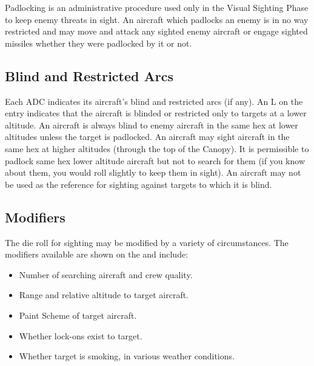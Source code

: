 Padlocking is an administrative procedure used only in the Visual Sighting Phase to keep enemy threats in sight. An aircraft which padlocks an enemy is in no way restricted and may move and attack any sighted enemy aircraft or engage sighted missiles whether they were padlocked by it or not. 

\subsection{Blind and Restricted Arcs} Each ADC indicates its aircraft's blind and restricted arcs (if any). An L on the entry indicates that the aircraft is blinded or restricted only to targets at a lower altitude. An aircraft is always blind to enemy aircraft in the same hex at lower altitudes unless the target is padlocked. An aircraft may sight aircraft in the same hex at higher altitudes (through the top of the Canopy). It is permissible to padlock same hex lower altitude aircraft but not to search for them (if you know about them, you would roll slightly to keep them in sight). An aircraft may not be used as the reference for sighting against targets to which it is blind.




\subsection{Modifiers} The die roll for sighting may be modified by a variety of circumstances. The modifiers available are shown on the  and include:

\begin{itemize}
    \item Number of searching aircraft and crew quality.
    \item Range and relative altitude to target aircraft.
    \item Paint Scheme of target aircraft.
    \item Whether lock-ons exist to target.
    \item Whether target is smoking,  in various weather conditions.
\end{itemize}

